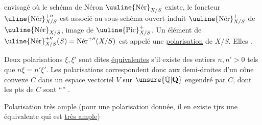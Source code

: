 envisagé où le schéma de Néron $\uuline{\operatorname{N\acute{e}r}}_{X/S}$ existe, le foncteur $\uline{\operatorname{N\acute{e}r}}^{+\prime\prime}_{X/S}$ est associé au sous-schéma ouvert induit $\uuline{\operatorname{N\acute{e}r}}^{+}_{X/S}$ de $\uuline{\operatorname{N\acute{e}r}}_{X/S}$, image de $\uuline{\operatorname{Pic}}^{+}_{X/S}$. Un élément de $\uline{\operatorname{N\acute{e}r}}^{+\prime\prime}_{X/S}(S)=\operatorname{N\acute{e}r}^{+\prime\prime}(X/S)$ est appelé une \uline{polarisation}  de $X/S$. Elles .

Deux polarisations $\xi,\xi'$ sont dites \uline{équivalentes} s'il existe des entiers $n,n'>0$ tels que $n\xi=n'\xi'$. Les  polarisations correspondent donc aux demi-droites d'un cône convexe $C$ \deleted{[ouvert]} dans un espace vectoriel $V$ sur $\unsure{\mathbb Q|\mathbf Q}$ engendré par $C$, dont les pts de $C$ sont ``'' \unsure{---}.

Polarisation \uline{très ample} (pour une polarisation donnée, il en existe tjrs une équivalente qui est \uline{très ample})
